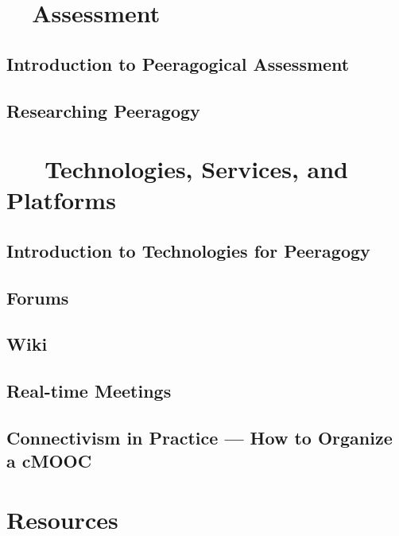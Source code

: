 \documentclass[ebook, 12pt, twoside]{memoir}
\begin{document}
\part{~~Assessment} \label{assessment-part} %
%
\chapter[\textbf{Peeragogical Assessment}]{Introduction to Peeragogical Assessment}

%
\chapter[\textbf{Researching Peeragogy}]{Researching Peeragogy}
%



\part{~~~Technologies, Services, and Platforms } \label{technologies-part} %
%
\chapter[\textbf{Peeragogy Technology}]{Introduction to Technologies for Peeragogy}

%
\chapter[\textbf{Forums}]{ Forums } 
%

%
\chapter[\textbf{Wiki}]{ Wiki } 
%

%
\chapter[\textbf{Real-time Meetings}]{ Real-time Meetings } 
%

%
\chapter[\textbf{How to Organize a MOOC}]{ Connectivism in Practice ---  How to Organize a cMOOC}
%



\part{Resources} \label{resources-part} %
%
%
\end{document}
